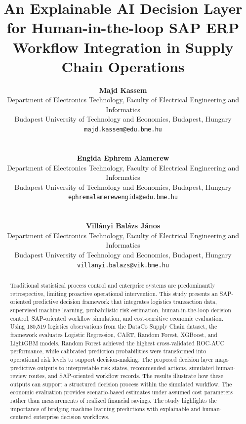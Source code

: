 \documentclass[10pt,a4paper]{article}
\date{}
\begin{document}
\title{An Explainable AI Decision Layer for Human-in-the-loop SAP ERP Workflow Integration in Supply Chain Operations}

\author{%
\begin{tabular}{c}
\textbf{Majd Kassem}\\
Department of Electronics Technology, Faculty of Electrical Engineering and Informatics\\
Budapest University of Technology and Economics, Budapest, Hungary\\
\texttt{majd.kassem@edu.bme.hu}
\end{tabular}
\\[1em]
\begin{tabular}{c}
\textbf{Engida Ephrem Alamerew}\\
Department of Electronics Technology, Faculty of Electrical Engineering and Informatics\\
Budapest University of Technology and Economics, Budapest, Hungary\\
\texttt{ephremalamerewengida@edu.bme.hu}
\end{tabular}
\\[1em]
\begin{tabular}{c}
\textbf{Villányi Balázs János}\\
Department of Electronics Technology, Faculty of Electrical Engineering and Informatics\\
Budapest University of Technology and Economics, Budapest, Hungary\\
\texttt{villanyi.balazs@vik.bme.hu}
\end{tabular}
}

\maketitle

\begin{abstract}
Traditional statistical process control and enterprise systems are predominantly retrospective, limiting proactive operational intervention. This study presents an SAP-oriented predictive decision framework that integrates logistics transaction data, supervised machine learning, probabilistic risk estimation, human-in-the-loop decision control, SAP-oriented workflow simulation, and cost-sensitive economic evaluation. Using 180,519 logistics observations from the DataCo Supply Chain dataset, the framework evaluates Logistic Regression, CART, Random Forest, XGBoost, and LightGBM models. Random Forest achieved the highest cross-validated ROC-AUC performance, while calibrated prediction probabilities were transformed into operational risk levels to support decision-making. The proposed decision layer maps predictive outputs to interpretable risk states, recommended actions, simulated human-review routes, and SAP-oriented workflow records. The results illustrate how these outputs can support a structured decision process within the simulated workflow. The economic evaluation provides scenario-based estimates under assumed cost parameters rather than measurements of realized financial savings. The study highlights the importance of bridging machine learning predictions with explainable and human-centered enterprise decision workflows.
\end{abstract}
\end{document}
